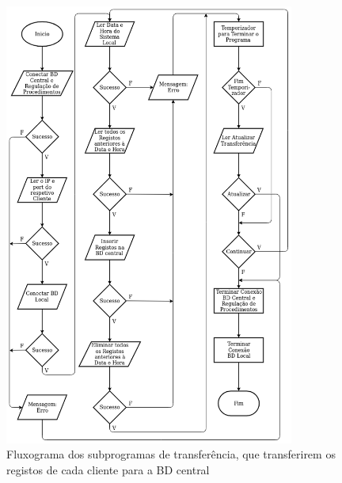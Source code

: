 \documentclass[11pt,twoside,a4paper]{report}
\begin{document}
\begin{figure}
	\begin{center}
		\includegraphics[width=0.85\textwidth]{fluxograma_transferencia_subprograma4} %
		\caption[Fluxograma dos subprogramas de transferência]{Fluxograma dos subprogramas de transferência, que transferirem os registos de cada cliente para a BD central}
		\label{fig:transferencia_subprograma}
	\end{center}
\end{figure}
\end{document}
